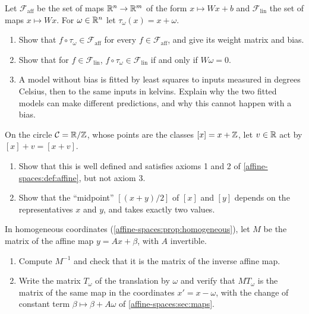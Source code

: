 \begin{notechapter}
\begin{exercise}\label{affine-spaces:exr:6}
Let $\mathcal F_{\mathrm{aff}}$ be the set of maps $\mathbb{R}^n\to\mathbb{R}^m$ of the form
$x\mapsto Wx + b$ and $\mathcal F_{\mathrm{lin}}$ the set of maps
$x\mapsto Wx$. For $\omega\in\mathbb{R}^n$ let $\tau_\omega(x) = x + \omega$.
\begin{enumerate}[nosep]
  \item Show that $f\circ\tau_\omega\in\mathcal F_{\mathrm{aff}}$ for every
        $f\in\mathcal F_{\mathrm{aff}}$, and give its weight matrix and
        bias.
  \item Show that for $f\in\mathcal F_{\mathrm{lin}}$,
        $f\circ\tau_\omega\in\mathcal F_{\mathrm{lin}}$ if and only if
        $W\omega = 0$.
  \item A model without bias is fitted by least squares to inputs measured
        in degrees Celsius, then to the same inputs in kelvins. Explain
        why the two fitted models can make different predictions, and why
        this cannot happen with a bias.
\end{enumerate}
\end{exercise}

\begin{exercise}\label{affine-spaces:exr:7}
On the circle $\mathcal C = \mathbb{R}/\mathbb{Z}$, whose points are the classes
$[x] = x + \mathbb{Z}$, let $v\in\mathbb{R}$ act by $[x] + v = [x + v]$.
\begin{enumerate}[nosep]
  \item Show that this is well defined and satisfies axioms 1 and 2 of
        \cref{affine-spaces:def:affine}, but not axiom 3.
  \item Show that the ``midpoint'' $[(x + y)/2]$ of $[x]$ and $[y]$ depends
        on the representatives $x$ and $y$, and takes exactly two values.
\end{enumerate}
\end{exercise}

\begin{exercise}\label{affine-spaces:exr:8}
In homogeneous coordinates
(\cref{affine-spaces:prop:homogeneous}), let $M$ be the matrix of the
affine map $y = Ax + \beta$, with $A$ invertible.
\begin{enumerate}[nosep]
  \item Compute $M^{-1}$ and check that it is the matrix of the inverse
        affine map.
  \item Write the matrix $T_\omega$ of the translation by $\omega$ and
        verify that $MT_\omega$ is the matrix of the same map in the
        coordinates $x' = x - \omega$, with the change of constant term
        $\beta\mapsto\beta + A\omega$ of \cref{affine-spaces:sec:maps}.
\end{enumerate}
\end{exercise}


\end{notechapter}
